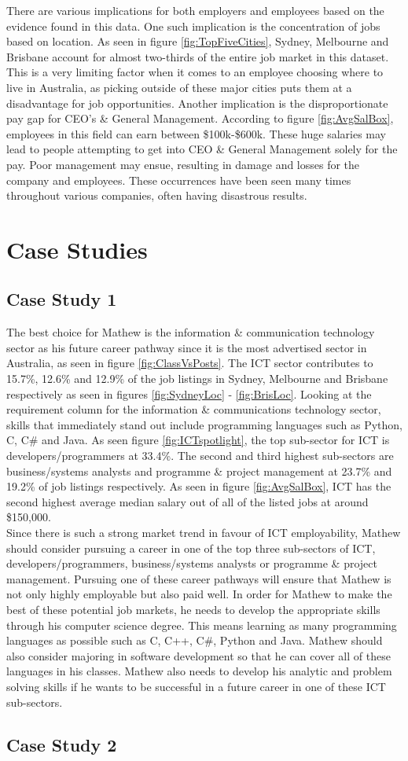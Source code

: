 \documentclass[twoside, 12pt, a4paper]{article}
\begin{document}
There are various implications for both employers and employees based on the evidence found in this data. One such implication is the concentration of jobs based on location. As seen in figure \ref{fig:TopFiveCities}, Sydney, Melbourne and Brisbane account for almost two-thirds of the entire job market in this dataset. This is a very limiting factor when it comes to an employee choosing where to live in Australia, as picking outside of these major cities puts them at a disadvantage for job opportunities. Another implication is the disproportionate pay gap for CEO's \& General Management. According to figure \ref{fig:AvgSalBox}, employees in this field can earn between \$100k-\$600k. These huge salaries may lead to people attempting to get into CEO \& General Management solely for the pay. Poor management may ensue, resulting in damage and losses for the company and employees. These occurrences have been seen many times throughout various companies, often having disastrous results. 


\newpage
\section{Case Studies}
\subsection{Case Study 1}

The best choice for Mathew is the information \& communication technology sector as his future career pathway since it is the most advertised sector in Australia, as seen in figure \ref{fig:ClassVsPosts}. The ICT sector contributes to 15.7\%, 12.6\% and 12.9\% of the job listings in Sydney, Melbourne and Brisbane respectively as seen in figures \ref{fig:SydneyLoc} - \ref{fig:BrisLoc}. Looking at the requirement column for the information \& communications technology sector, skills that immediately stand out include programming languages such as Python, C, C\# and Java. As seen figure \ref{fig:ICTspotlight}, the top sub-sector for ICT is developers/programmers at 33.4\%. The second and third highest sub-sectors are business/systems analysts and programme \& project management at 23.7\% and 19.2\% of job listings respectively. As seen in figure \ref{fig:AvgSalBox}, ICT has the second highest average median salary out of all of the listed jobs at around \$150,000.\\
Since there is such a strong market trend in favour of ICT employability, Mathew should consider pursuing a career in one of the top three sub-sectors of ICT, developers/programmers, business/systems analysts or programme \& project management. Pursuing one of these career pathways will ensure that Mathew is not only highly employable but also paid well. In order for Mathew to make the best of these potential job markets, he needs to develop the appropriate skills through his computer science degree. This means learning as many programming languages as possible such as C, C++, C\#, Python and Java. Mathew should also consider majoring in software development so that he can cover all of these languages in his classes. Mathew also needs to develop his analytic and problem solving skills if he wants to be successful in a future career in one of these ICT sub-sectors. 

\subsection{Case Study 2}
\end{document}
